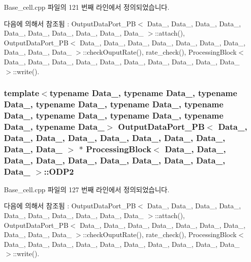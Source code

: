 Base\+\_\+cell.\+cpp 파일의 121 번째 라인에서 정의되었습니다.



다음에 의해서 참조됨 \+:  Output\+Data\+Port\+\_\+\+P\+B$<$ Data\+\_, Data\+\_, Data\+\_, Data\+\_, Data\+\_, Data\+\_, Data\+\_, Data\+\_, Data\+\_, Data\+\_ $>$\+::attach(), Output\+Data\+Port\+\_\+\+P\+B$<$ Data\+\_, Data\+\_, Data\+\_, Data\+\_, Data\+\_, Data\+\_, Data\+\_, Data\+\_, Data\+\_, Data\+\_ $>$\+::check\+Ouput\+Rate(), rate\+\_\+check(), Processing\+Block$<$ Data\+\_, Data\+\_, Data\+\_, Data\+\_, Data\+\_, Data\+\_, Data\+\_, Data\+\_, Data\+\_, Data\+\_ $>$\+::write().

\subsubsection[{\texorpdfstring{O\+D\+P2}{ODP2}}]{\setlength{\rightskip}{0pt plus 5cm}template$<$typename Data\+\_, typename Data\+\_, typename Data\+\_, typename Data\+\_, typename Data\+\_, typename Data\+\_, typename Data\+\_, typename Data\+\_, typename Data\+\_, typename Data\+\_$>$ {\bf Output\+Data\+Port\+\_\+\+PB}$<$ Data\+\_, Data\+\_, Data\+\_, Data\+\_, Data\+\_, Data\+\_, Data\+\_, Data\+\_, Data\+\_, Data\+\_ $>$ $\ast$ {\bf Processing\+Block}$<$ Data\+\_, Data\+\_, Data\+\_, Data\+\_, Data\+\_, Data\+\_, Data\+\_, Data\+\_, Data\+\_, Data\+\_ $>$\+::O\+D\+P2}\hypertarget{classProcessingBlock_aac2c071b5f31f6548eea0dd387148bc9}{}\label{classProcessingBlock_aac2c071b5f31f6548eea0dd387148bc9}


Base\+\_\+cell.\+cpp 파일의 127 번째 라인에서 정의되었습니다.



다음에 의해서 참조됨 \+:  Output\+Data\+Port\+\_\+\+P\+B$<$ Data\+\_, Data\+\_, Data\+\_, Data\+\_, Data\+\_, Data\+\_, Data\+\_, Data\+\_, Data\+\_, Data\+\_ $>$\+::attach(), Output\+Data\+Port\+\_\+\+P\+B$<$ Data\+\_, Data\+\_, Data\+\_, Data\+\_, Data\+\_, Data\+\_, Data\+\_, Data\+\_, Data\+\_, Data\+\_ $>$\+::check\+Ouput\+Rate(), rate\+\_\+check(), Processing\+Block$<$ Data\+\_, Data\+\_, Data\+\_, Data\+\_, Data\+\_, Data\+\_, Data\+\_, Data\+\_, Data\+\_, Data\+\_ $>$\+::write().

